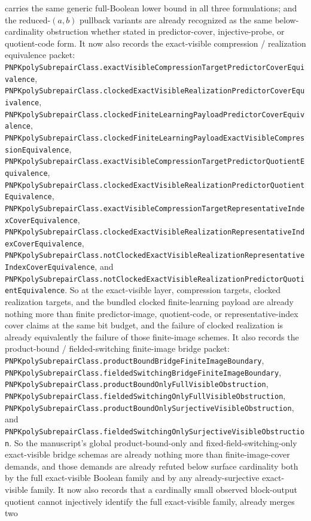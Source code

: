 \documentclass[11pt]{article}
\theoremstyle{remark}
\begin{document}
carries the same generic full-Boolean lower bound in all three formulations;
and the reduced-\((a,b)\) pullback variants are already recognized as the same
below-cardinality obstruction whether stated in predictor-cover,
injective-probe, or quotient-code form.
It now also records the exact-visible compression / realization equivalence
packet:
\texttt{PNPKpolySubrepairClass.exactVisibleCompressionTargetPredictorCoverEquivalence},
\texttt{PNPKpolySubrepairClass.clockedExactVisibleRealizationPredictorCoverEquivalence},
\texttt{PNPKpolySubrepairClass.clockedFiniteLearningPayloadPredictorCoverEquivalence},
\texttt{PNPKpolySubrepairClass.clockedFiniteLearningPayloadExactVisibleCompressionEquivalence},
\texttt{PNPKpolySubrepairClass.exactVisibleCompressionTargetPredictorQuotientEquivalence},
\texttt{PNPKpolySubrepairClass.clockedExactVisibleRealizationPredictorQuotientEquivalence},
\texttt{PNPKpolySubrepairClass.exactVisibleCompressionTargetRepresentativeIndexCoverEquivalence},
\texttt{PNPKpolySubrepairClass.clockedExactVisibleRealizationRepresentativeIndexCoverEquivalence},
\texttt{PNPKpolySubrepairClass.notClockedExactVisibleRealizationRepresentativeIndexCoverEquivalence},
and
\texttt{PNPKpolySubrepairClass.notClockedExactVisibleRealizationPredictorQuotientEquivalence}.
So at the exact-visible layer, compression targets, clocked realization
targets, and the bundled clocked finite-learning payload are already nothing
more than finite predictor-image, quotient-code, or representative-index cover
claims at the same bit budget, and the failure of clocked realization is
already equivalently the failure of those finite-image schemes.
It also records the product-bound / fielded-switching finite-image bridge
packet:
\texttt{PNPKpolySubrepairClass.productBoundBridgeFiniteImageBoundary},
\texttt{PNPKpolySubrepairClass.fieldedSwitchingBridgeFiniteImageBoundary},
\texttt{PNPKpolySubrepairClass.productBoundOnlyFullVisibleObstruction},
\texttt{PNPKpolySubrepairClass.fieldedSwitchingOnlyFullVisibleObstruction},
\texttt{PNPKpolySubrepairClass.productBoundOnlySurjectiveVisibleObstruction},
and
\texttt{PNPKpolySubrepairClass.fieldedSwitchingOnlySurjectiveVisibleObstruction}.
So the manuscript's global product-bound-only and fixed-field-switching-only
exact-visible bridge schemas are already nothing more than finite-image-cover
demands, and those demands are already refuted below surface cardinality both
by the full exact-visible Boolean family and by any already-surjective
exact-visible family.
It now also records that a cardinally small observed block-output quotient
cannot injectively identify the full exact-visible family, already merges two
\end{document}
